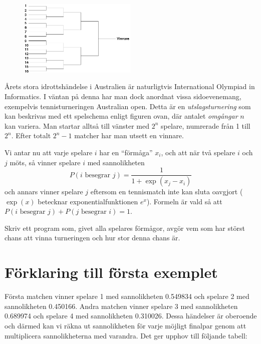 

\begin{figure}[!h]
\begin{center}
\includegraphics[width=0.5\textwidth]{australian.png}
\end{center}
\end{figure}

Årets stora idrottshändelse i Australien är naturligtvis International Olympiad in Informatics. I väntan på denna har man dock anordnat vissa sidoevenemang, exempelvis tennisturneringen Australian open. Detta är en {\em utslagsturnering} som kan
beskrivas med ett spelschema enligt figuren ovan, där antalet {\em omgångar} $n$ kan variera. Man startar alltså till vänster med $2^n$ spelare, numrerade från 1 till $2^n$. Efter totalt $2^n - 1$ matcher har man utsett en vinnare.

Vi antar nu att varje spelare $i$ har en ``förmåga'' $x_i$, och att när två spelare $i$ och $j$ möts, så vinner spelare $i$ med sannolikheten
\begin{displaymath}
P(i \text{ besegrar } j) = \frac{1}{1+\exp(x_j-x_i)}
\end{displaymath}
och annars vinner spelare $j$ eftersom en tennismatch inte kan sluta
oavgjort ($\exp(x)$ betecknar exponentialfunktionen $e^x$). Formeln är vald så att $P(i \text{ besegrar } j)+P(j \text{ besegrar } i)=1$.

Skriv ett program som, givet alla spelares förmågor, avgör vem som har
störst chans att vinna turneringen och hur stor denna chans är.

\section*{Förklaring till första exemplet}
Första matchen vinner spelare 1 med sannolikheten 0.549834 och spelare 2 med sannolikheten 0.450166.
Andra matchen vinner spelare 3 med sannolikheten 0.689974 och spelare 4 med sannolikheten 0.310026.
Dessa händelser är oberoende och därmed kan vi räkna ut sannolikheten
för varje möjligt finalpar genom att multiplicera sannolikheterna med
varandra. Det ger upphov till följande tabell:

